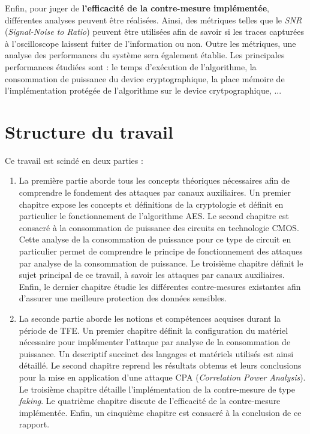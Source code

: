 \documentclass[oneside]{book}
\begin{document}
\newpage
Enfin, pour juger de \textbf{l'efficacité de la contre-mesure implémentée}, différentes analyses peuvent être réalisées. Ainsi, des métriques telles que le \textit{SNR} (\textit{Signal-Noise to Ratio}) peuvent être utilisées afin de savoir si les traces capturées à l'oscilloscope laissent fuiter de l'information ou non. Outre les métriques, une analyse des performances du système sera également établie. Les principales performances étudiées sont : le temps d'exécution de l'algorithme, la consommation de puissance du device cryptographique, la place mémoire de l'implémentation protégée de l'algorithme sur le device crytpographique, ...

\section{Structure du travail}

\hspace{-0.5cm}Ce travail est scindé en deux parties : 
\begin{enumerate}
\item La première partie aborde tous les concepts théoriques nécessaires afin de comprendre le fondement des attaques par canaux auxiliaires. Un premier chapitre expose les concepts et définitions de la cryptologie et définit en particulier le fonctionnement de l'algorithme AES. Le second chapitre est consacré à la consommation de puissance des circuits en technologie CMOS. Cette analyse de la consommation de puissance pour ce type de circuit en particulier permet de comprendre le principe de fonctionnement des attaques par analyse de la consommation de puissance. Le troisième chapitre définit le sujet principal de ce travail, à savoir les attaques par canaux auxiliaires. Enfin, le dernier chapitre étudie les différentes contre-mesures existantes afin d'assurer une meilleure protection des données sensibles. 
\item La seconde partie aborde les notions et compétences acquises durant la période de TFE. Un premier chapitre définit la configuration du matériel nécessaire pour implémenter l'attaque par analyse de la consommation de puissance. Un descriptif succinct des langages et matériels utilisés est ainsi détaillé. Le second chapitre reprend les résultats obtenus et leurs conclusions pour la mise en application d'une attaque CPA (\textit{Correlation Power Analysis}). Le troisième chapitre détaille l'implémentation de la contre-mesure de type \textit{faking}. Le quatrième chapitre discute de l'efficacité de la contre-mesure implémentée. Enfin, un cinquième chapitre est consacré à la conclusion de ce rapport.
\end{enumerate}
\end{document}
